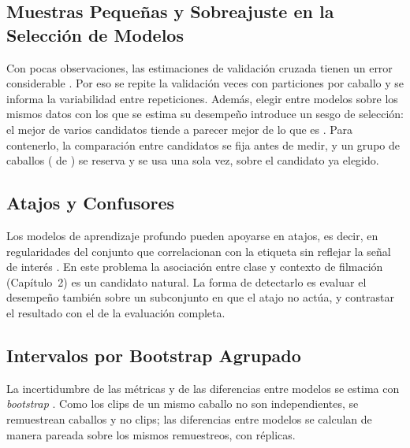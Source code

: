 \subsection{Muestras Pequeñas y Sobreajuste en la Selección de Modelos}
Con pocas observaciones, las estimaciones de validación cruzada tienen un error considerable \parencite{varoquaux2018}. Por eso se repite la validación \Repeticiones{} veces con \Folds{} particiones por caballo y se informa la variabilidad entre repeticiones. Además, elegir entre modelos sobre los mismos datos con los que se estima su desempeño introduce un sesgo de selección: el mejor de varios candidatos tiende a parecer mejor de lo que es \parencite{cawley2010}. Para contenerlo, la comparación entre candidatos se fija antes de medir, y un grupo de caballos (\CaballosReserva{} de \CaballosTotal{}) se reserva y se usa una sola vez, sobre el candidato ya elegido.

\subsection{Atajos y Confusores}
Los modelos de aprendizaje profundo pueden apoyarse en atajos, es decir, en regularidades del conjunto que correlacionan con la etiqueta sin reflejar la señal de interés \parencite{geirhos2020}. En este problema la asociación entre clase y contexto de filmación (Capítulo~2) es un candidato natural. La forma de detectarlo es evaluar el desempeño también sobre un subconjunto en que el atajo no actúa, y contrastar el resultado con el de la evaluación completa.

\subsection{Intervalos por Bootstrap Agrupado}
La incertidumbre de las métricas y de las diferencias entre modelos se estima con \textit{bootstrap} \parencite{efron1993}. Como los clips de un mismo caballo no son independientes, se remuestrean caballos y no clips; las diferencias entre modelos se calculan de manera pareada sobre los mismos remuestreos, con \ReplicasBootstrap{} réplicas.

